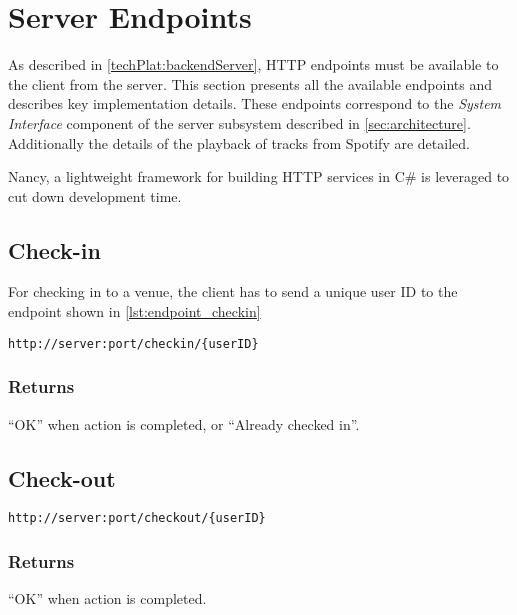 \section{Server Endpoints}
\label{imp:backendServer}

As described in \cref{techPlat:backendServer}, HTTP endpoints must be
available to the client from the server. This section presents all the
available endpoints and describes key implementation
details. These endpoints correspond to the \emph{System Interface} component of the
server subsystem described in \cref{sec:architecture}. Additionally the details of the playback of tracks from
Spotify are detailed.

Nancy, a lightweight framework for building HTTP services in C\# is leveraged
to cut down development time.

\subsection{Check-in}
For checking in to a venue, the client has to send a unique user ID to
the endpoint shown in \cref{lst:endpoint_checkin}

\begin{lstlisting}[label={lst:endpoint_checkin}, caption={HTTP endpoint allowing client to check-in to a venue. Text surrounded by curly brackets are parameters.}]
http://server:port/checkin/{userID}
\end{lstlisting}

\subsubsection{Returns}
\enquote{OK} when action is completed, or \enquote{Already checked in}.

\subsection{Check-out}

\begin{lstlisting}[label={lst:endpoint_checkout}, caption={Text surrounded by curly brackets are parameters.}]
http://server:port/checkout/{userID}
\end{lstlisting}

\subsubsection{Returns}
\enquote{OK} when action is completed.

